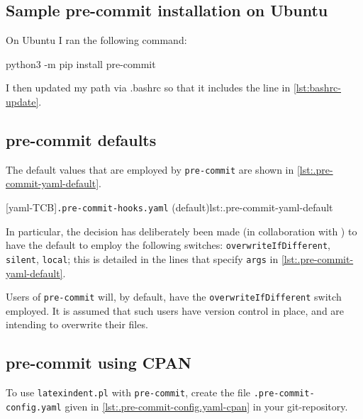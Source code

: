  \subsection{Sample pre-commit installation on Ubuntu}\label{sec:pre-commit-ubuntu}
  On Ubuntu I ran the following command:

  \begin{commandshell}
python3 -m pip install pre-commit
\end{commandshell}

  I then updated my path via .bashrc so that it includes the line in
  \cref{lst:bashrc-update}.

 \subsection{pre-commit defaults}
  The default values that are employed by \texttt{pre-commit} are shown in \cref{lst:.pre-commit-yaml-default}.

  [yaml-TCB]{\texttt{.pre-commit-hooks.yaml} (default)}{lst:.pre-commit-yaml-default}

  In particular, the decision has deliberately been made (in collaboration with
  \cite{holzhausprecommit}) to have the default to employ the following switches:
  \texttt{overwriteIfDifferent}, \texttt{silent}, \texttt{local}; this is detailed in the
  lines that specify \texttt{args} in \cref{lst:.pre-commit-yaml-default}.

  \begin{warning}
   Users of \texttt{pre-commit} will, by default, have the \texttt{overwriteIfDifferent}
   switch employed. It is assumed that such users have version control in place, and are
   intending to overwrite their files.
  \end{warning}

 \subsection{pre-commit using CPAN}\label{sec:pre-commit-cpan}

  To use \texttt{latexindent.pl} with \texttt{pre-commit}, create the file
  \texttt{.pre-commit-config.yaml} given in \cref{lst:.pre-commit-config.yaml-cpan} in
  your git-repository.   

